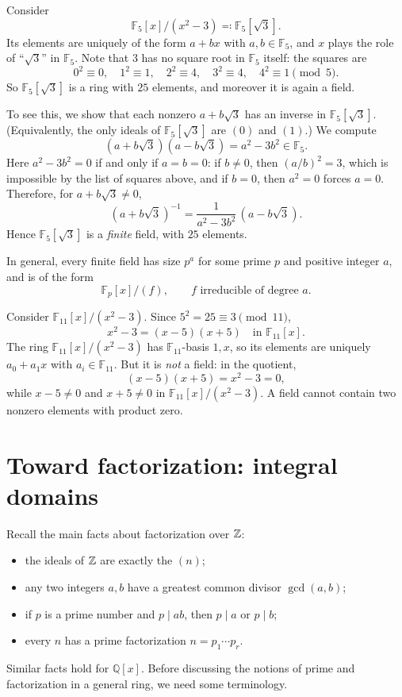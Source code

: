 \documentclass[reqno,11pt]{amsart}
\newcommand{\Q}{\mathbb{Q}}
\newcommand{\F}{\mathbb{F}}
\begin{document}
\begin{example}[The field {$\F_5[\sqrt3]$}]
Consider
\[
  \F_5[x]/(x^2-3)\eqqcolon\F_5[\sqrt3].
\]
Its elements are uniquely of the form $a+bx$ with $a,b\in\F_5$, and
$x$ plays the role of ``$\sqrt3$'' in $\F_5$. Note that $3$ has no
square root in $\F_5$ itself: the squares are
\[
  0^2\equiv0,\quad 1^2\equiv1,\quad 2^2\equiv4,\quad
  3^2\equiv4,\quad 4^2\equiv1 \pmod 5.
\]
So $\F_5[\sqrt3]$ is a ring with $25$ elements, and moreover it is
again a field.

To see this, we show that each nonzero $a+b\sqrt3$ has an inverse in
$\F_5[\sqrt3]$. (Equivalently, the only ideals of $\F_5[\sqrt3]$ are
$(0)$ and $(1)$.) We compute
\[
  (a+b\sqrt3)(a-b\sqrt3)=a^2-3b^2 \in\F_5 .
\]
Here $a^2-3b^2=0$ if and only if $a=b=0$: if $b\neq0$, then
$(a/b)^2=3$, which is impossible by the list of squares above, and
if $b=0$, then $a^2=0$ forces $a=0$. Therefore, for
$a+b\sqrt3\neq0$,
\[
  (a+b\sqrt3)^{-1}=\frac{1}{a^2-3b^2}\,(a-b\sqrt3).
\]
Hence $\F_5[\sqrt3]$ is a \emph{finite} field, with $25$ elements.
\end{example}

\begin{remark}
In general, every finite field has size $p^a$ for some prime $p$ and
positive integer $a$, and is of the form
\[
  \F_p[x]/(f),\qquad f \text{ irreducible of degree } a .
\]
\end{remark}

\begin{example}
Consider $\F_{11}[x]/(x^2-3)$. Since $5^2=25\equiv3\pmod{11}$,
\[
  x^2-3=(x-5)(x+5)\quad\text{in }\F_{11}[x].
\]
The ring $\F_{11}[x]/(x^2-3)$ has $\F_{11}$-basis $1,x$, so its
elements are uniquely $a_0+a_1x$ with $a_i\in\F_{11}$.
But it is \emph{not} a field: in the quotient,
\[
  (x-5)(x+5)=x^2-3=0,
\]
while $x-5\neq0$ and $x+5\neq0$ in $\F_{11}[x]/(x^2-3)$.
A field cannot contain two nonzero elements with product zero.
\end{example}

\section{Toward factorization: integral domains}

Recall the main facts about factorization over $\mathbb{Z}$:
\begin{itemize}
  \item the ideals of $\mathbb{Z}$ are exactly the $(n)$;
  \item any two integers $a,b$ have a greatest common divisor
  $\gcd(a,b)$;
  \item if $p$ is a prime number and $p\mid ab$, then $p\mid a$ or
  $p\mid b$;
  \item every $n$ has a prime factorization $n=p_1\cdots p_r$.
\end{itemize}
Similar facts hold for $\Q[x]$. Before discussing the notions of prime
and factorization in a general ring, we need some terminology.
\end{document}

